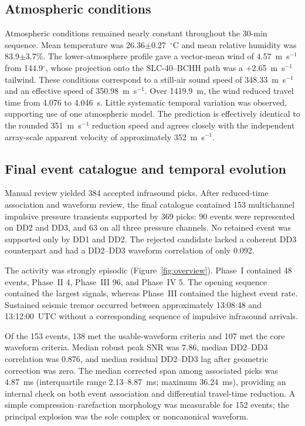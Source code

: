 \documentclass[]{seismica}
\begin{document}
\subsection{Atmospheric conditions}
\label{sec:results_atmosphere}

Atmospheric conditions remained nearly constant throughout the 30-min
sequence. Mean temperature was 26.36$\pm$0.27~$^\circ$C and mean relative
humidity was 83.9$\pm$3.7\%. The lower-atmosphere profile gave a vector-mean
wind of 4.57~m~s$^{-1}$ from 144.9$^\circ$, whose projection onto the
SLC-40--BCHH path was a +2.65~m~s$^{-1}$ tailwind. These conditions correspond
to a still-air sound speed of 348.33~m~s$^{-1}$ and an effective speed of
350.98~m~s$^{-1}$. Over 1419.9~m, the wind reduced travel time from 4.076 to
4.046~s. Little systematic temporal variation was observed, supporting use of
one atmospheric model. The prediction is effectively identical to the rounded
351~m~s$^{-1}$ reduction speed and agrees closely with the independent
array-scale apparent velocity of approximately 352~m~s$^{-1}$.


\subsection{Final event catalogue and temporal evolution}
\label{sec:results_catalogue}

Manual review yielded 384 accepted infrasound picks. After reduced-time
association and waveform review, the final catalogue contained 153
multichannel impulsive pressure transients
supported by 369 picks: 90 events were represented on DD2 and DD3, and 63 on
all three pressure channels. No retained event was supported only by DD1 and
DD2. The rejected candidate lacked a coherent DD3 counterpart and had a
DD2--DD3 waveform correlation of only 0.092.

The activity was strongly episodic (Figure~\ref{fig:overview}). Phase~I
contained 48 events, Phase~II 4, Phase~III 96, and Phase~IV 5. The opening
sequence contained the largest signals, whereas Phase~III contained the
highest event rate. Sustained seismic tremor occurred between approximately
13:08:48 and 13:12:00~UTC without a corresponding sequence of impulsive
infrasound arrivals.

Of the 153 events, 138 met the usable-waveform criteria and 107 met the core
waveform criteria. Median robust peak SNR was 7.86, median DD2--DD3 correlation
was 0.876, and median residual DD2--DD3 lag after geometric correction was
zero. The median corrected span among associated picks was 4.87~ms
(interquartile range 2.13--8.87~ms; maximum 36.24~ms), providing an internal
check on both event association and differential travel-time reduction. A
simple compression--rarefaction morphology was measurable for 152 events; the
principal explosion was the sole complex or noncanonical waveform.
\end{document}
